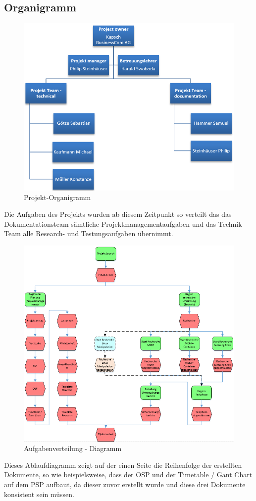 \subsection{Organigramm}
\begin{figure}[H]
	\includegraphics[scale=0.6]{Images/organigramm}
	\caption{Projekt-Organigramm}
\end{figure}
Die Aufgaben des Projekts wurden ab diesem Zeitpunkt so verteilt das das Dokumentationsteam sämtliche Projektmanagementaufgaben und das Technik Team alle Research- und Testungsaufgaben übernimmt.
\begin{figure}[H]
	\includegraphics[scale=0.7]{Images/arbeitsteilung}
	\caption{Aufgabenverteilung - Diagramm}
\end{figure}
Dieses Ablaufdiagramm zeigt auf der einen Seite die Reihenfolge der erstellten Dokumente, so wie beispielsweise, dass der OSP und der Timetable / Gant Chart auf dem PSP aufbaut, da dieser zuvor erstellt wurde und diese drei Dokumente konsistent sein müssen.
